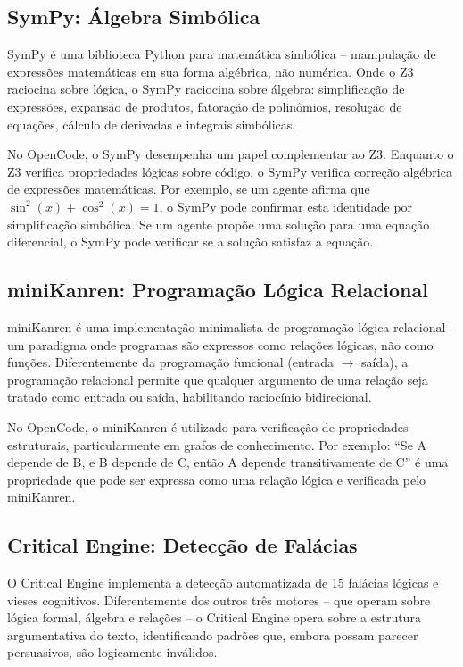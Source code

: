 \documentclass[12pt,a4paper,sumario=tradicional,openany]{abntex2}
\begin{document}
\subsection{SymPy: Álgebra Simbólica}

SymPy é uma biblioteca Python para matemática simbólica -- manipulação de expressões matemáticas em sua forma algébrica, não numérica. Onde o Z3 raciocina sobre lógica, o SymPy raciocina sobre álgebra: simplificação de expressões, expansão de produtos, fatoração de polinômios, resolução de equações, cálculo de derivadas e integrais simbólicas.

No OpenCode, o SymPy desempenha um papel complementar ao Z3. Enquanto o Z3 verifica propriedades lógicas sobre código, o SymPy verifica correção algébrica de expressões matemáticas. Por exemplo, se um agente afirma que $\sin^2(x) + \cos^2(x) = 1$, o SymPy pode confirmar esta identidade por simplificação simbólica. Se um agente propõe uma solução para uma equação diferencial, o SymPy pode verificar se a solução satisfaz a equação.

\subsection{miniKanren: Programação Lógica Relacional}

miniKanren é uma implementação minimalista de programação lógica relacional -- um paradigma onde programas são expressos como relações lógicas, não como funções. Diferentemente da programação funcional (entrada $\rightarrow$ saída), a programação relacional permite que qualquer argumento de uma relação seja tratado como entrada ou saída, habilitando raciocínio bidirecional.

No OpenCode, o miniKanren é utilizado para verificação de propriedades estruturais, particularmente em grafos de conhecimento. Por exemplo: ``Se A depende de B, e B depende de C, então A depende transitivamente de C'' é uma propriedade que pode ser expressa como uma relação lógica e verificada pelo miniKanren.

\subsection{Critical Engine: Detecção de Falácias}

O Critical Engine implementa a detecção automatizada de 15 falácias lógicas e vieses cognitivos. Diferentemente dos outros três motores -- que operam sobre lógica formal, álgebra e relações -- o Critical Engine opera sobre a estrutura argumentativa do texto, identificando padrões que, embora possam parecer persuasivos, são logicamente inválidos.
\end{document}
